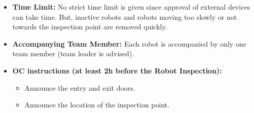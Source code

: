 \begin{itemize}
	\item \textbf{Time Limit:} No strict time limit is given since approval of external devices can take time. But, inactive robots and robots moving too slowly or not towards the inspection point are removed quickly.
	\item \textbf{Accompanying Team Member:} Each robot is accompanied by only one team member (team leader is advised).
	\item \textbf{OC instructions (at least 2h before the Robot Inspection):}
	\begin{itemize}
		\item Announce the entry and exit doors.
		\item Announce the location of the inspection point.
	\end{itemize}
\end{itemize}


